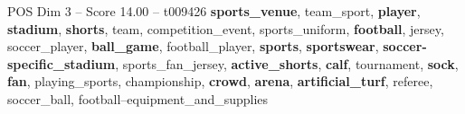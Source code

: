\begin{textsample}{POS Dim 3 – Score 14.00 – t009426}  \label{ex:f3_pos_036}
\textbf{sports\_venue}, team\_sport, \textbf{player}, \textbf{stadium}, \textbf{shorts}, team, competition\_event, sports\_uniform, \textbf{football}, jersey, soccer\_player, \textbf{ball\_game}, football\_player, \textbf{sports}, \textbf{sportswear}, \textbf{soccer-specific\_stadium}, sports\_fan\_jersey, \textbf{active\_shorts}, \textbf{calf}, tournament, \textbf{sock}, \textbf{fan}, playing\_sports, championship, \textbf{crowd}, \textbf{arena}, \textbf{artificial\_turf}, referee, soccer\_ball, football--equipment\_and\_supplies

\end{textsample}
